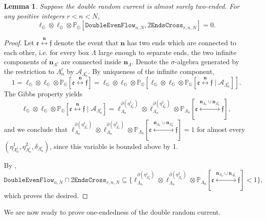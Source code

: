 \documentclass[article,11pt,reqno]{amsart}
\newcommand{\cc}{\leftrightarrow}
\newcommand{\nn}{\mathbf{n}}
\newtheorem{lemma}[theorem]{Lemma}
\begin{document}
\begin{lemma}\label{lemma:even_flow_is_impossible} Suppose the double random current is almost surely two-ended.
For any positive integers $r <n<N$,  $$ \ell_{\mathbb{G}}  \otimes \ell_{\mathbb{G}} \otimes \mathbb{P}_{\mathbb{G}}[\mathtt{DoubleEvenFlow}_{n,N} , 2\mathtt{EndsCross}_{r,n,N}] = 0.$$
\end{lemma}
\begin{proof}

Let $\mathfrak{e}\overset{\nn}{\cc} \mathfrak{f}$ denote the event that $\nn$ has two ends which are connected to each other, i.e. for every box $\Lambda$ large enough to separate ends, the two infinite components of $\nn_{\Lambda^c}$ are connected inside $\nn_{\Lambda}$. Denote the $\sigma$-algebra generated by the restriction to $\Lambda_{n}^c$ by  $\mathcal{A}_{\Lambda_n^c}$.
By uniqueness of the infinite component, 
$$
1=\ell_{\mathbb{G}}\otimes \ell_{\mathbb{G}}\otimes \mathbb{P}_{\mathbb{G}}[\mathfrak{e}\overset{\nn}{\cc} \mathfrak{f}]=\ell_{\mathbb{G}}\otimes \ell_{\mathbb{G}}\otimes \mathbb{P}_{\mathbb{G}}[\ell_{\mathbb{G}}\otimes \ell_{\mathbb{G}}\otimes \mathbb{P}_{\mathbb{G}}[\mathfrak{e}\overset{\nn}{\cc} \mathfrak{f}\mid \mathcal{A}_{\Lambda_n^c}]].
$$
The Gibbs property yields $$
\ell_{\mathbb{G}}\otimes \ell_{\mathbb{G}}\otimes \mathbb{P}_{\mathbb{G}}[\mathfrak{e}\overset{\nn}{\cc} \mathfrak{f}\mid \mathcal{A}_{\Lambda_n^c}]=\ell_{\Lambda_n}^{\partial(\eta^1_{\Lambda_n^c})}\otimes \ell_{\Lambda_n}^{\partial(\eta^2_{\Lambda_n^c})}\otimes \mathbb{P}_{\Lambda_n}[\mathfrak{e}\overset{\nn_{\Lambda_n}\cup \nn_{\Lambda_n^c}}{\cc} \mathfrak{f}],
$$
and
we conclude that $\ell_{\Lambda_n}^{\partial(\eta^1_{\Lambda_n^c})}\otimes \ell_{\Lambda_n}^{\partial(\eta^2_{\Lambda_n^c})}\otimes \mathbb{P}_{\Lambda_n}[\mathfrak{e}\overset{\nn_{\Lambda_n}\cup \nn_{\Lambda_n^c}}{\cc} \mathfrak{f}]=1$ for almost every $(\eta^1_{\Lambda_n^c},\eta^2_{\Lambda_n^c},\delta_{\Lambda_n^c})$, since this variable is bounded above by 1.

By , $\mathtt{DoubleEvenFlow}_{n,N} \cap 2\mathtt{EndsCross}_{r,n,N}\subseteq \{\ell_{\Lambda_n}^{\partial(\eta^1_{\Lambda_n^c})}\otimes \ell_{\Lambda_n}^{\partial(\eta^2_{\Lambda_n^c})}\otimes \mathbb{P}_{\Lambda_n}[\mathfrak{e}\overset{\nn_{\Lambda_n}\cup \nn_{\Lambda_n^c}}{\cc} \mathfrak{f}]<1\},$ which proves the desired.
\end{proof}



 We are now ready to prove one-endedness of the double random current.
\end{document}

